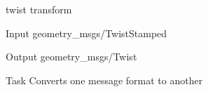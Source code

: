 \begin{frame}{twist transform}
	\begin{alertblock}{Input}
	geometry\_msgs/TwistStamped
    \end{alertblock}
    
    \begin{alertblock}{Output}
	geometry\_msgs/Twist
    \end{alertblock}
    
    \begin{alertblock}{Task}
   Converts one message format to another
    \end{alertblock}
\end{frame}

